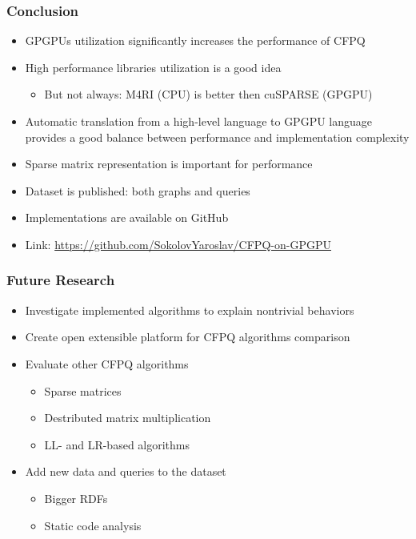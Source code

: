 \documentclass[xcolor=table]{beamer}
\begin{document}
\begin{frame}[fragile] \frametitle{Conclusion}
  \begin{itemize}
    \item GPGPUs utilization significantly increases the performance of CFPQ
    \pause
    \item High performance libraries utilization is a good idea
    \begin{itemize}
      \item But not always: M4RI (CPU) is better then cuSPARSE (GPGPU)
    \end{itemize}
    \pause
    \item Automatic translation from a high-level language to GPGPU language provides a good balance between performance and implementation complexity
    \pause
    \item Sparse matrix representation is important for performance %
  \end{itemize}
  \pause
  \begin{itemize}
    \item Dataset is published: both graphs and queries
    \item Implementations are available on GitHub
    \item Link: \url{https://github.com/SokolovYaroslav/CFPQ-on-GPGPU}
  \end{itemize}
\end{frame}

\begin{frame}[fragile] \frametitle{Future Research}
  \begin{itemize}
    \item Investigate implemented algorithms to explain nontrivial behaviors
    \item Create open extensible platform for CFPQ algorithms comparison
    \item Evaluate other CFPQ algorithms
    \begin{itemize}
      \item Sparse matrices
      \item Destributed matrix multiplication
      \item LL- and LR-based algorithms
    \end{itemize}
    \item Add new data and queries to the dataset
    \begin{itemize}
      \item Bigger RDFs
      \item Static code analysis
    \end{itemize}
  \end{itemize}
\end{frame}
\end{document}
